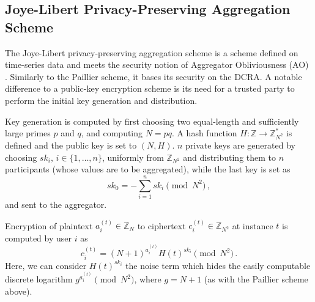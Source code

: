 \documentclass[10pt,letterpaper,oneside,twocolumn,journal]{IEEEtran}
\theoremstyle{definition}
\theoremstyle{definition}
\theoremstyle{remark}
\begin{document}
% 
% 

\subsection{Joye-Libert Privacy-Preserving Aggregation Scheme} \label{subsec:joye_libert_scheme}
The Joye-Libert privacy-preserving aggregation scheme \cite{joyeScalableSchemePrivacyPreserving2013} is a scheme defined on time-series data and meets the security notion of Aggregator Obliviousness (AO) \cite{shiPrivacyPreservingAggregationTimeSeries2011}. Similarly to the Paillier scheme, it bases its security on the DCRA. A notable difference to a public-key encryption scheme is its need for a trusted party to perform the initial key generation and distribution.

Key generation is computed by first choosing two equal-length and sufficiently large primes $p$ and $q$, and computing $N=pq$. A hash function $H:\mathbb{Z} \rightarrow \mathbb{Z}_{N^2}^*$ is defined and the public key is set to $(N, H)$. $n$ private keys are generated by choosing $sk_i,\,i\in\{1,\dots,n\}$, uniformly from $\mathbb{Z}_{N^2}$ and distributing them to $n$ participants (whose values are to be aggregated), while the last key is set as
\begin{equation}
    sk_0 = -\sum^{n}_{i=1}sk_i \pmod{N^2}\,,
\end{equation}
and sent to the aggregator.

Encryption of plaintext $a^{(t)}_{i} \in \mathbb{Z}_N$ to ciphertext $c^{(t)}_{i} \in \mathbb{Z}_{N^2}$ at instance $t$ is computed by user $i$ as
\begin{equation}
    c^{(t)}_{i} = (N+1)^{a^{(t)}_{i}} H(t)^{sk_i} \pmod{N^2}\,.
\end{equation}
Here, we can consider $H(t)^{sk_i}$ the noise term which hides the easily computable discrete logarithm $g^{a^{(t)}_{i}} \pmod{N^2}$, where $g=N+1$ (as with the Paillier scheme above).
\end{document}
